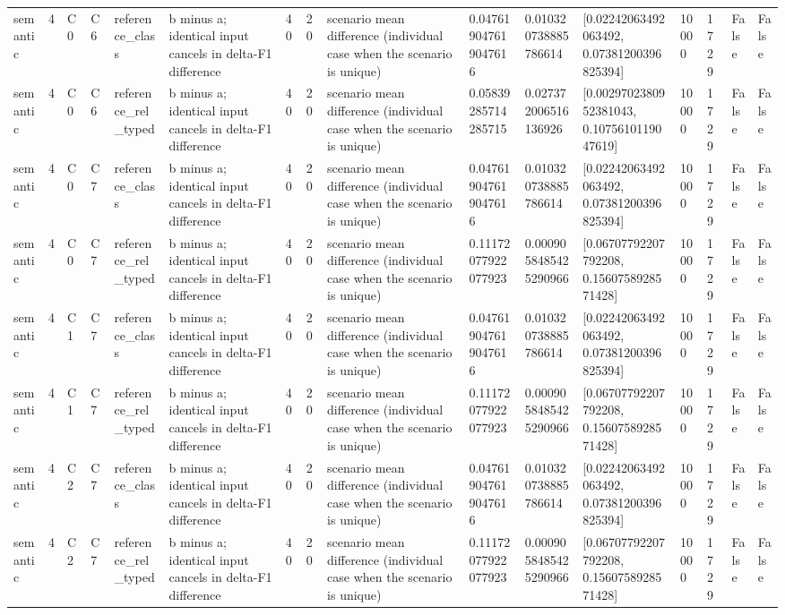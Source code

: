 \begin{tabular}{llllllllllllllll}
semantic & 4 & C0 & C6 & reference\_class & b minus a; identical input cancels in delta-F1 difference & 40 & 20 & scenario mean difference (individual case when the scenario is unique) & 0.047619047619047616 & 0.010320738885786614 & [0.02242063492063492, 0.07381200396825394] & 10000 & 1729 & False & False \\
semantic & 4 & C0 & C6 & reference\_rel\_typed & b minus a; identical input cancels in delta-F1 difference & 40 & 20 & scenario mean difference (individual case when the scenario is unique) & 0.05839285714285715 & 0.027372006516136926 & [0.0029702380952381043, 0.1075610119047619] & 10000 & 1729 & False & False \\
semantic & 4 & C0 & C7 & reference\_class & b minus a; identical input cancels in delta-F1 difference & 40 & 20 & scenario mean difference (individual case when the scenario is unique) & 0.047619047619047616 & 0.010320738885786614 & [0.02242063492063492, 0.07381200396825394] & 10000 & 1729 & False & False \\
semantic & 4 & C0 & C7 & reference\_rel\_typed & b minus a; identical input cancels in delta-F1 difference & 40 & 20 & scenario mean difference (individual case when the scenario is unique) & 0.11172077922077923 & 0.0009058485425290966 & [0.06707792207792208, 0.1560758928571428] & 10000 & 1729 & False & False \\
semantic & 4 & C1 & C7 & reference\_class & b minus a; identical input cancels in delta-F1 difference & 40 & 20 & scenario mean difference (individual case when the scenario is unique) & 0.047619047619047616 & 0.010320738885786614 & [0.02242063492063492, 0.07381200396825394] & 10000 & 1729 & False & False \\
semantic & 4 & C1 & C7 & reference\_rel\_typed & b minus a; identical input cancels in delta-F1 difference & 40 & 20 & scenario mean difference (individual case when the scenario is unique) & 0.11172077922077923 & 0.0009058485425290966 & [0.06707792207792208, 0.1560758928571428] & 10000 & 1729 & False & False \\
semantic & 4 & C2 & C7 & reference\_class & b minus a; identical input cancels in delta-F1 difference & 40 & 20 & scenario mean difference (individual case when the scenario is unique) & 0.047619047619047616 & 0.010320738885786614 & [0.02242063492063492, 0.07381200396825394] & 10000 & 1729 & False & False \\
semantic & 4 & C2 & C7 & reference\_rel\_typed & b minus a; identical input cancels in delta-F1 difference & 40 & 20 & scenario mean difference (individual case when the scenario is unique) & 0.11172077922077923 & 0.0009058485425290966 & [0.06707792207792208, 0.1560758928571428] & 10000 & 1729 & False & False \\

\end{tabular}
